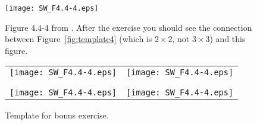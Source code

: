 \documentclass[11pt,titlepage,fleqn]{article}
\begin{document}

\begin{figure}
\centering
\texttt{[image: SW\_F4.4-4.eps]}
\caption{
Figure 4.4-4 from \citet{SteinWysession}.
After the exercise you should see the connection between Figure~\ref{fig:template4} (which is $2 \times 2$, not $3 \times 3$) and this figure.
\label{fig:SW}
}
\end{figure}

\begin{figure}
\hspace{-1cm}
\begin{tabular}{c|c}
\texttt{[image: SW\_F4.4-4.eps]} & \texttt{[image: SW\_F4.4-4.eps]} \\
& \\ \hline
& \\
\texttt{[image: SW\_F4.4-4.eps]} & \texttt{[image: SW\_F4.4-4.eps]} 
\end{tabular}
\caption{
Template for bonus exercise.
\label{fig:SWfour}
}
\end{figure}

\clearpage\pagebreak



\end{document}
